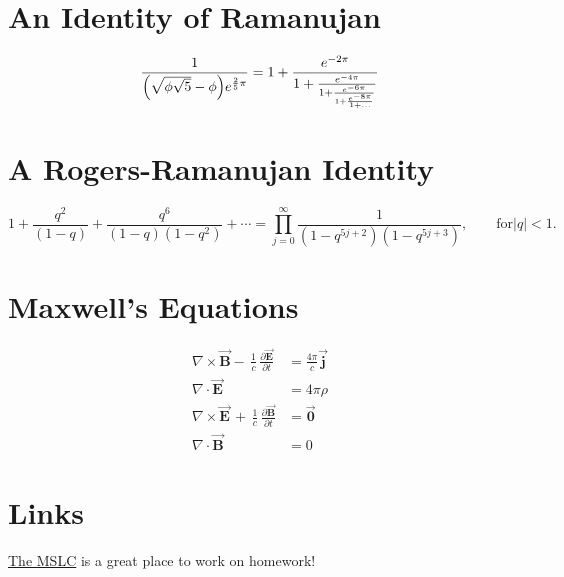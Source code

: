 \documentclass{ximera}
\begin{document}
\section{An Identity of Ramanujan}
\[ \frac{1}{\Bigl(\sqrt{\phi \sqrt{5}}-\phi\Bigr) e^{\frac25 \pi}} =
1+\frac{e^{-2\pi}} {1+\frac{e^{-4\pi}} {1+\frac{e^{-6\pi}}
{1+\frac{e^{-8\pi}} {1+\ldots} } } } \]

\section{A Rogers-Ramanujan Identity}
\[  1 +  \frac{q^2}{(1-q)}+\frac{q^6}{(1-q)(1-q^2)}+\cdots =
\prod_{j=0}^{\infty}\frac{1}{(1-q^{5j+2})(1-q^{5j+3})},
\quad\quad \text{for} |q|<1. \]

\section{Maxwell's Equations}
\[  \begin{aligned}
\nabla \times \vec{\mathbf{B}} -\, \frac1c\, \frac{\partial\vec{\mathbf{E}}}{\partial t} & = \frac{4\pi}{c}\vec{\mathbf{j}} \\
\nabla \cdot \vec{\mathbf{E}} & = 4 \pi \rho \\
\nabla \times \vec{\mathbf{E}}\, +\, \frac1c\, \frac{\partial\vec{\mathbf{B}}}{\partial t} & = \vec{\mathbf{0}} \\
\nabla \cdot \vec{\mathbf{B}} & = 0 
\end{aligned}\]

\section{Links}
\href{http://mslc.osu.edu}{
The MSLC} is a great place to work on homework!
\end{document}
